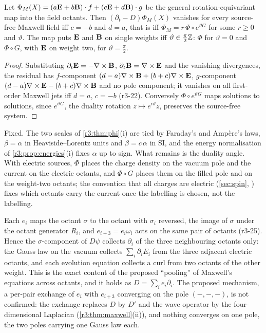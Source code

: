\begin{proposition}
\label{r3:prop:maxunique}
Let $\Phi_M(X)=(a\mathbf E+b\mathbf B)\cdot f+(c\mathbf E+d\mathbf B)\cdot g$ be the general rotation-equivariant map into the field octants. Then $(\partial_t-D)\Phi_M(X)$ vanishes
for every source-free Maxwell field iff $c=-b$ and $d=a$, that is iff $\Phi_M=r\,\Phi\circ e^{\vartheta G}$ for some $r\ge0$ and $\vartheta$. The map puts
$\mathbf E$ and $\mathbf B$ on single weights iff $\vartheta\in\tfrac\pi2\mathbb{Z}$: $\Phi$ for $\vartheta=0$ and $\Phi\circ G$, with $\mathbf E$ on weight two, for $\vartheta=\tfrac\pi2$.
\end{proposition}

\begin{proof}
Substituting $\partial_t\mathbf E=-\nabla\times\mathbf B$, $\partial_t\mathbf B=\nabla\times\mathbf E$ and the vanishing divergences, the residual has $f$-component $(d-a)\nabla\times\mathbf B+(b+c)\nabla\times\mathbf E$,
$g$-component $(d-a)\nabla\times\mathbf E-(b+c)\nabla\times\mathbf B$ and no pole component; it vanishes on all first-order Maxwell jets iff $d=a$, $c=-b$ (r3-22). Conversely
$\Phi\circ e^{\vartheta G}$ maps solutions to solutions, since $e^{\vartheta G}$, the duality rotation $z\mapsto e^{i\vartheta}z$, preserves the source-free system.
\end{proof}

Fixed. The two scales of \cref{r3:thm:phi}(i) are tied by Faraday's and Amp\`ere's laws, $\beta=\alpha$ in Heaviside--Lorentz units and $\beta=c\,\alpha$
in SI, and the energy normalisation of \cref{r3:prop:energies}(i) fixes $\alpha$ up to sign. What remains is the duality angle. With electric
sources, $\Phi$ places the charge density on the vacuum pole and the current on the electric octants, and $\Phi\circ G$ places them on the
filled pole and on the weight-two octants; the convention that all charges are electric (\cref{sec:spin}, \cite{Jackson}) fixes which
octants carry the current once the labelling is chosen, not the labelling.

\begin{remark}
\label{r3:rem:pooling}
Each $e_i$ maps the octant $\sigma$ to the octant with $\sigma_i$ reversed, the image of $\sigma$ under the octant generator $R_i$, and
$e_{i+3}=e_i\omega_i$ acts on the same pair of octants (r3-25). Hence the $\sigma$-component of $D\psi$ collects $\partial_i$ of the three neighbouring
octants only: the Gauss law on the vacuum collects $\sum_i\partial_iE_i$ from the three adjacent electric octants, and each evolution equation
collects a curl from two octants of the other weight. This is the exact content of the proposed ``pooling'' of Maxwell's equations across
octants, and it holds as $D=\sum_ie_i\partial_i$. The proposed mechanism, a per-pair exchange of $e_i$ with $e_{i+3}$ converging on the pole
$(-,-,-)$, is not confirmed: the exchange replaces $D$ by $D'$ and the wave operator by the four-dimensional Laplacian
(\cref{r3:thm:maxwell}(ii)), and nothing converges on one pole, the two poles carrying one Gauss law each.
\end{remark}

